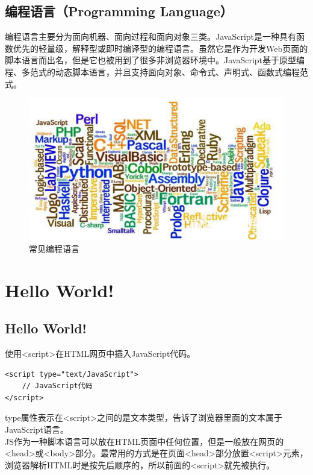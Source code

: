 \subsection{编程语言（Programming Language）}

编程语言主要分为面向机器、面向过程和面向对象三类。JavaScript是一种具有函数优先的轻量级，解释型或即时编译型的编程语言。虽然它是作为开发Web页面的脚本语言而出名，但是它也被用到了很多非浏览器环境中。JavaScript基于原型编程、多范式的动态脚本语言，并且支持面向对象、命令式、声明式、函数式编程范式。

\begin{figure}[H]
	\centering
	\includegraphics[scale=0.9]{img/C9/9-1/1.png}
	\caption{常见编程语言}
\end{figure}

\section{Hello World!}

\subsection{Hello World!}

使用<script>在HTML网页中插入JavaScript代码。 \\

\begin{lstlisting}[style=htmlcssjs]
<script type="text/JavaScript">
    // JavaScript代码
</script>
\end{lstlisting}

type属性表示在<script>之间的是文本类型，告诉了浏览器里面的文本属于JavaScript语言。 \\

JS作为一种脚本语言可以放在HTML页面中任何位置，但是一般放在网页的<head>或<body>部分。最常用的方式是在页面<head>部分放置<script>元素，浏览器解析HTML时是按先后顺序的，所以前面的<script>就先被执行。 \\

